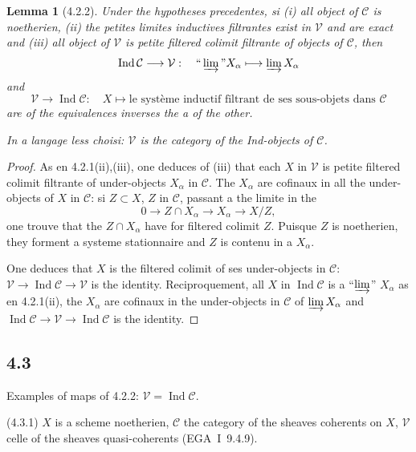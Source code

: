 \documentclass[12pt,a4paper]{article}
\theoremstyle{plain}
\newtheorem{lemma}[theorem]{Lemma}
\theoremstyle{definition}
\theoremstyle{remark}
\DeclareMathOperator{\Ind}{Ind}
\begin{document}
\begin{lemma}[4.2.2]\label{lem:4.2.2}
Under the hypotheses precedentes, si (i) all object of $\mathcal{C}$ is noetherien, (ii) the petites limites inductives filtrantes exist in $\mathcal{V}$ and are exact and (iii) all object of $\mathcal{V}$ is petite filtered colimit filtrante of objects of $\mathcal{C}$, then
\[
\Ind\mathcal{C} 
\longrightarrow 
\mathcal{V}: 
\quad 
\text{``}
\varinjlim
\text{''} X_\alpha 
\longmapsto 
\varinjlim X_\alpha
\]
and
\[
\mathcal{V} 
\longrightarrow 
\Ind\mathcal{C}: 
\quad X 
\longmapsto 
\text{le système inductif filtrant de ses sous-objets dans } 
\mathcal{C}
\]
are of the equivalences inverses the a of the other.

In a langage less choisi: $\mathcal{V}$ is the category of the Ind-objects of $\mathcal{C}$.
\end{lemma}

\begin{proof}
As en 4.2.1(ii),(iii), one deduces of (iii) that each $X$ in $\mathcal{V}$ is petite filtered colimit filtrante of under-objects $X_\alpha$ in $\mathcal{C}$. The $X_\alpha$ are cofinaux in all the under-objects of $X$ in $\mathcal{C}$: si $Z 
\subset X$, $Z$ in $\mathcal{C}$, passant a the limite in the
\[
0 
\longrightarrow Z 
\cap X_\alpha 
\longrightarrow X_\alpha 
\longrightarrow X/Z,
\]
one trouve that the $Z 
\cap X_\alpha$ have for filtered colimit $Z$. Puisque $Z$ is noetherien, they forment a systeme stationnaire and $Z$ is contenu in a $X_\alpha$.

One deduces that $X$ is the filtered colimit of ses under-objects in $\mathcal{C}$: $\mathcal{V} 
\to 
\Ind\mathcal{C} 
\to 
\mathcal{V}$ is the identity. Reciproquement, all $X$ in $\Ind\mathcal{C}$ is a ``$\varinjlim$'' $X_\alpha$ as en 4.2.1(ii), the $X_\alpha$ are cofinaux in the under-objects in $\mathcal{C}$ of $\varinjlim X_\alpha$ and $\Ind\mathcal{C} 
\to 
\mathcal{V} 
\to 
\Ind\mathcal{C}$ is the identity.
\end{proof}

\subsection*{4.3}

Examples of maps of 4.2.2: $\mathcal{V} = 
\Ind\mathcal{C}$.

(4.3.1) $X$ is a scheme noetherien, $\mathcal{C}$ the category of the sheaves coherents on $X$, $\mathcal{V}$ celle of the sheaves quasi-coherents (EGA~I~9.4.9).
\end{document}
